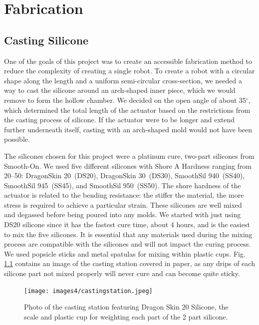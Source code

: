 \chapter{Fabrication}
\label{chapter:fabrication}

\section{Casting Silicone}
One of the goals of this project was to create an accessible fabrication method to reduce the complexity of creating a single robot. To create a robot with a circular shape along the length and a uniform semi-circular cross-section, we needed a way to cast the silicone around an arch-shaped inner piece, which we would remove to form the hollow chamber. We decided on the open angle of about 35$^\circ$, which determined the total length of the actuator based on the restrictions from the casting process of silicone. If the actuator were to be longer and extend further underneath itself, casting with an arch-shaped mold would not have been possible. 

The silicones chosen for this project were a platinum cure, two-part silicones from Smooth-On. We used five different silicones with Shore A Hardness ranging from 20--50: DragonSkin 20~(DS20), DragonSkin 30~(DS30), SmoothSil 940~(SS40), SmoothSil 945~(SS45), and SmoothSil 950~(SS50). The shore hardness of the actuator is related to the bending resistance: the stiffer the material, the more stress is required to achieve a particular strain. These silicones are well mixed and degassed before being poured into any molds. We started with just using DS20 silicone since it has the fastest cure time, about 4 hours, and is the easiest to mix the five silicones. It is essential that any materials used during the mixing process are compatible with the silicones and will not impact the curing process. We used popsicle sticks and metal spatulas for mixing within plastic cups. Fig. \ref{fig:castingstation} contains an image of the casting station covered in paper, as any drips of each silicone part not mixed properly will never cure and can become quite sticky. 

\begin{figure}[ht]
    \centering
    \texttt{[image: images4/castingstation.jpeg]}
    \caption{Photo of the casting station featuring Dragon Skin 20 Silicone, the scale and plastic cup for weighting each part of the 2 part silicone.}
    \label{fig:castingstation}
\end{figure}


